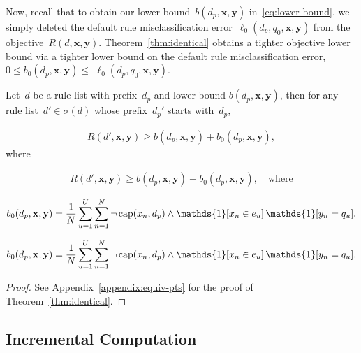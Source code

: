\documentclass[twoside,11pt]{article}
\def\one{\mathds{1}}
\newcommand{\x}{\mathbf{x}}
\newcommand{\y}{\mathbf{y}}
\def\RL{{d}}
\def\Prefix{d_p}
\def\Default{q_0}
\def\Obj{R}
\def\Loss{\ell}
\def\Cap{\textnormal{cap}}
\def\StartsWith{\sigma}
\def\one{\mathds{1}}
\newcommand{\nn}{\nonumber}
\begin{document}
Now, recall that to obtain our lower bound~${b(\Prefix, \x, \y)}$
in~\eqref{eq:lower-bound}, we simply deleted the
default rule misclassification error~$\Loss_0(\Prefix, \Default, \x, \y)$
from the objective~${\Obj(\RL, \x, \y)}$.
%
Theorem~\ref{thm:identical} obtains a tighter objective lower bound
via a tighter lower bound on the default rule misclassification error,
${0 \le b_0(\Prefix, \x, \y) \le}$ $\Loss_0(\Prefix, \Default, \x, \y)$.

\begin{theorem}
\label{thm:identical}
Let~$\RL$ be a rule list with prefix~$\Prefix$
and lower bound ${b(\Prefix, \x, \y)}$,
then for any rule list~${\RL' \in \StartsWith(\RL)}$
whose prefix~$\Prefix'$ starts with~$\Prefix$,
\begin{arxiv}
\begin{align}
\Obj(\RL', \x, \y) \ge b(\Prefix, \x, \y) + b_0(\Prefix, \x, \y),
\label{eq:identical}
\end{align}
where
\end{arxiv}
\begin{kdd}
\begin{align}
\Obj(\RL', \x, \y) \ge b(\Prefix, \x, \y) + b_0(\Prefix, \x, \y), \quad \text{where}
\end{align}
\end{kdd}
\begin{arxiv}
\begin{align}
b_0(\Prefix, \x, \y) = \frac{1}{N} \sum_{u=1}^U \sum_{n=1}^N
    \neg\, \Cap(x_n, \Prefix) \wedge \one [ x_n \in e_u ]\, \one [ y_n = q_u ].
\label{eq:lb-b0}
\end{align}
\end{arxiv}
\begin{kdd}
\begin{align}
b_0(\Prefix, \x, \y) = \frac{1}{N} \sum_{u=1}^U \sum_{n=1}^N
    \neg\, \Cap(x_n, \Prefix) \wedge \one [ x_n \in e_u ]\, \one [ y_n = q_u ]. \nn
\end{align}
\end{kdd}
\end{theorem}

\begin{arxiv}
\begin{proof}
See Appendix~\ref{appendix:equiv-pts} for the proof of Theorem~\ref{thm:identical}.
\end{proof}
\end{arxiv}

\begin{arxiv}
\section{Incremental Computation}
\label{sec:incremental}
\end{arxiv}
\end{document}
